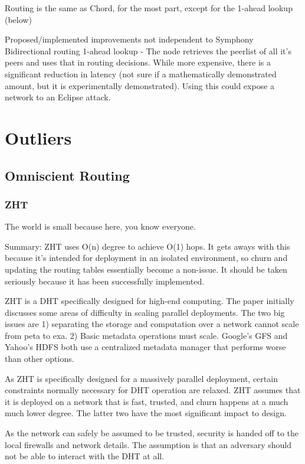 \documentclass[10pt,letterpaper]{report}
\begin{document}
Routing  is the same as Chord, for the most part, except for the 1-ahead lookup (below)



Proposed/implemented improvements not independent to Symphony
Bidirectional routing
1-ahead lookup - The node retrieves the peerlist of all it's peers and uses that in routing decisions.  While more expensive, there is a significant reduction in latency (not sure if a mathematically demonstrated amount, but it is experimentally demonstrated).  Using this could expose a network to an Eclipse attack.


\chapter{Outliers}
\section{Omniscient Routing}

\subsection{ZHT}
The world is small because here, you know everyone.

Summary: ZHT\cite{li2013zht} uses O(n) degree to achieve O(1) hops.   It gets aways with this because it's intended for deployment in an isolated environment, so churn and updating the routing tables essentially  become a non-issue. It should be taken seriously because it has been successfully implemented.

ZHT is a DHT specifically designed for high-end computing.  The paper initially discusses  some areas of difficulty in scaling parallel deployments.  The two big issues are 1)  separating the storage and computation over a network cannot scale from peta to exa.  2) Basic metadata operations must scale.  Google's GFS and Yahoo's HDFS both use a centralized metadata manager that performs worse than other options.

As ZHT is specifically designed for a massively parallel deployment, certain constraints normally necessary for DHT operation are relaxed.  ZHT assumes that it is deployed on a network that is fast, trusted, and churn happens at a much much lower degree.  The latter two have the most significant impact to design.

 As the network can safely be assumed to be trusted, security is handed off to the local firewalls and network details.   The assumption is that an adversary should not be able to interact with the DHT at all.  
\end{document}
